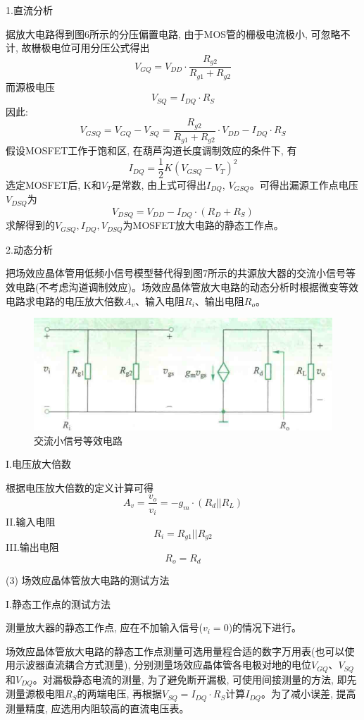 \documentclass[10pt, a4paper]{article} %
\begin{document}
1.直流分析

据放大电路得到图6所示的分压偏置电路, 由于MOS管的栅极电流极小, 可忽略不计, 故栅极电位可用分压公式得出
$$
V_{GQ} = V_{DD} \cdot \frac{R_{g2}}{R_{g1} + R_{g2}}
$$
而源极电压
$$
V_{SQ} = I_{DQ} \cdot R_{S}
$$
因此: 
$$
V_{GSQ} = V_{GQ} - V_{SQ} = \frac{R_{g2}}{R_{g1} + R_{g2}} \cdot V_{DD} - I_{DQ} \cdot R_{S}
$$
假设MOSFET工作于饱和区, 在葫芦沟道长度调制效应的条件下, 有
$$
I_{DQ} = \frac{1}{2} K (V_{GSQ} - V_{T})^2
$$
选定MOSFET后, K和$V_{T}$是常数, 由上式可得出$I_{DQ}$, $V_{GSQ}$。可得出漏源工作点电压$V_{DSQ}$为
$$
V_{DSQ} = V_{DD} - I_{DQ} \cdot (R_{D}+R_{S})
$$
求解得到的$V_{GSQ}, I_{DQ}, V_{DSQ}$为MOSFET放大电路的静态工作点。

2.动态分析

把场效应晶体管用低频小信号模型替代得到图7所示的共源放大器的交流小信号等效电路(不考虑沟道调制效应)。场效应晶体管放大电路的动态分析时根据微变等效电路求电路的电压放大倍数$A_v$、输入电阻$R_i$、输出电阻$R_o$。
\begin{figure}[ht]
    \centering
    \includegraphics[width=0.7\linewidth]{image/7.png}
    \caption{交流小信号等效电路}
    \label{fig:side:g}
\end{figure}

I.电压放大倍数

根据电压放大倍数的定义计算可得
$$
A_v = \frac{v_o}{v_i} = -g_m \cdot (R_d || R_L)
$$
II.输入电阻
$$
R_i = R_{g1} || R_{g2} 
$$
III.输出电阻
$$
R_o = R_d
$$

(3) 场效应晶体管放大电路的测试方法
\vspace{0.5cm}

I.静态工作点的测试方法

测量放大器的静态工作点, 应在不加输入信号($v_i = 0$)的情况下进行。

场效应晶体管放大电路的静态工作点测量可选用量程合适的数字万用表(也可以使用示波器直流耦合方式测量), 分别测量场效应晶体管各电极对地的电位$V_{GQ}$、$V_{SQ}$和$V_{DQ}$。对漏极静态电流的测量, 为了避免断开漏极, 可使用间接测量的方法, 即先测量源极电阻$R_S$的两端电压, 再根据$V_{SQ} = I_{DQ} \cdot R_S$计算$I_{DQ}$。为了减小误差, 提高测量精度, 应选用内阻较高的直流电压表。
\end{document}
